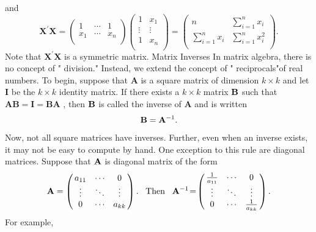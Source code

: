 \documentclass[11pt]{article}
\begin{document}
and
\[
\mathbf{X}^{\prime} \mathbf{X}=\left( \begin{matrix} {1} & {\cdots} & {1} \\ {x_{1}} & {\cdots} & {x_{n}} \\ \end{matrix} \right) \left( \begin{matrix} {1} & {x_{1}} \\ {\vdots} & {\vdots} \\ {1} & {x_{n}} \\ \end{matrix} \right)=\left( \begin{matrix} {n} & {\sum_{i=1}^{n} x_{i}} \\ {\sum_{i=1}^{n} x_{i}} & {\sum_{i=1}^{n} x_{i}^{2}} \\ \end{matrix} \right) .
\]
Note that \(\mathbf{X}^{\prime} \mathbf{X}\) is a symmetric matrix.
Matrix Inverses
In matrix algebra, there is no concept of " division." Instead, we extend the concept
of " reciprocals"of real numbers. To begin, suppose that \(\mathbf{A}\) is a square matrix of
dimension \(k \times k\) and let \(\mathbf{I}\) be the \(k \times k\) identity matrix. If there exists a \(k \times k\)
matrix \({\bf B}\) such that \(\mathbf{A} \mathbf{B}=\mathbf{I}=\mathbf{B} \mathbf{A}\) , then \({\bf B}\) is called the inverse of \(\mathbf{A}\) and is written
\[
{\bf B}={\bf A}^{-1} .
\]
Now, not all square matrices have inverses. Further, even when an inverse exists,
 it may not be easy to compute by hand. One exception to this rule are diagonal
matrices. Suppose that \({\bf A}\) is diagonal matrix of the form
\[
\mathbf{A}=\left( \! \! \begin{array} {c c c} {a_{1 1}} & {\cdots} & {0} \\ {\vdots} & {\ddots} & {\vdots} \\ {0} & {\cdots} & {a_{k k}} \\ \end{array} \! \! \right) . \; \; \; \mathrm{T h e n} \; \; \; \mathbf{A}^{-1} \!=\! \left( \! \! \begin{array} {c c c} {{\frac{1} {a_{1 1}}}} & {\cdots} & {0} \\ {\vdots} & {\ddots} & {\vdots} \\ {0} & {\cdots} & {{\frac{1} {a_{k k}}}} \\ \end{array} \! \! \right) .
\]
For example,
\end{document}
